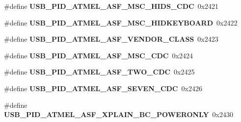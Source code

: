 \begin{DoxyCompactItemize}
\item 
\hypertarget{group__usb__atmel__ids__group_ga7f671a8fef4c800facd114d32ec13930}{\#define {\bfseries U\-S\-B\-\_\-\-P\-I\-D\-\_\-\-A\-T\-M\-E\-L\-\_\-\-A\-S\-F\-\_\-\-M\-S\-C\-\_\-\-H\-I\-D\-S\-\_\-\-C\-D\-C}~0x2421}\label{group__usb__atmel__ids__group_ga7f671a8fef4c800facd114d32ec13930}

\item 
\hypertarget{group__usb__atmel__ids__group_ga323b1456acbbd9126e18618488321628}{\#define {\bfseries U\-S\-B\-\_\-\-P\-I\-D\-\_\-\-A\-T\-M\-E\-L\-\_\-\-A\-S\-F\-\_\-\-M\-S\-C\-\_\-\-H\-I\-D\-K\-E\-Y\-B\-O\-A\-R\-D}~0x2422}\label{group__usb__atmel__ids__group_ga323b1456acbbd9126e18618488321628}

\item 
\hypertarget{group__usb__atmel__ids__group_ga6f40a017a808ee64cc6628e729230594}{\#define {\bfseries U\-S\-B\-\_\-\-P\-I\-D\-\_\-\-A\-T\-M\-E\-L\-\_\-\-A\-S\-F\-\_\-\-V\-E\-N\-D\-O\-R\-\_\-\-C\-L\-A\-S\-S}~0x2423}\label{group__usb__atmel__ids__group_ga6f40a017a808ee64cc6628e729230594}

\item 
\hypertarget{group__usb__atmel__ids__group_gaaec5e91e3234b5e606ba733040bd2915}{\#define {\bfseries U\-S\-B\-\_\-\-P\-I\-D\-\_\-\-A\-T\-M\-E\-L\-\_\-\-A\-S\-F\-\_\-\-M\-S\-C\-\_\-\-C\-D\-C}~0x2424}\label{group__usb__atmel__ids__group_gaaec5e91e3234b5e606ba733040bd2915}

\item 
\hypertarget{group__usb__atmel__ids__group_ga3c9a3ea9e317f1f85577cdcc0006c694}{\#define {\bfseries U\-S\-B\-\_\-\-P\-I\-D\-\_\-\-A\-T\-M\-E\-L\-\_\-\-A\-S\-F\-\_\-\-T\-W\-O\-\_\-\-C\-D\-C}~0x2425}\label{group__usb__atmel__ids__group_ga3c9a3ea9e317f1f85577cdcc0006c694}

\item 
\hypertarget{group__usb__atmel__ids__group_gacc4da5f577d8be8f22e417a18869106f}{\#define {\bfseries U\-S\-B\-\_\-\-P\-I\-D\-\_\-\-A\-T\-M\-E\-L\-\_\-\-A\-S\-F\-\_\-\-S\-E\-V\-E\-N\-\_\-\-C\-D\-C}~0x2426}\label{group__usb__atmel__ids__group_gacc4da5f577d8be8f22e417a18869106f}

\item 
\hypertarget{group__usb__atmel__ids__group_ga5beb6949523c4d53a1974b7696a4d57f}{\#define {\bfseries U\-S\-B\-\_\-\-P\-I\-D\-\_\-\-A\-T\-M\-E\-L\-\_\-\-A\-S\-F\-\_\-\-X\-P\-L\-A\-I\-N\-\_\-\-B\-C\-\_\-\-P\-O\-W\-E\-R\-O\-N\-L\-Y}~0x2430}\label{group__usb__atmel__ids__group_ga5beb6949523c4d53a1974b7696a4d57f}


\end{DoxyCompactItemize}
